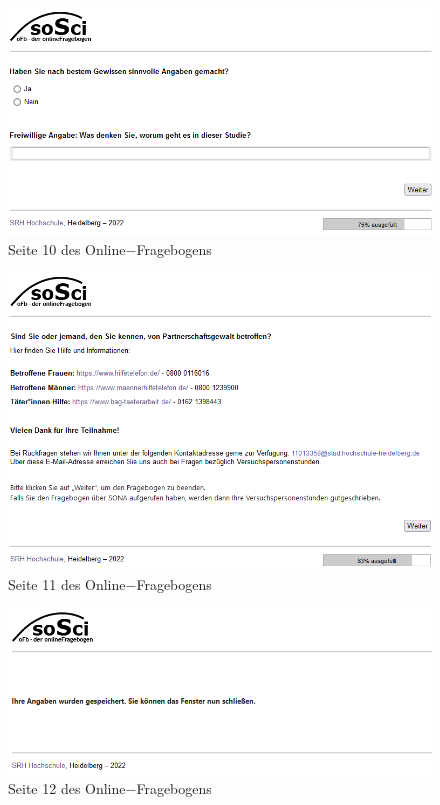 \begin{appendices}
    \begin{figure}[htb!]
        \centering
            \includegraphics[width=\textwidth, frame]{Seite 10.png}
            \caption[]{Seite 10 des Online$-$Fragebogens}
    \end{figure}
    
    \newpage
    \begin{figure}[htb!]
        \centering
            \includegraphics[width=\textwidth,frame]{Seite 11.png}
            \caption[]{Seite 11 des Online$-$Fragebogens}
    \end{figure}
    
    \begin{figure}[htb!]
        \centering
            \includegraphics[width=\textwidth, frame]{Seite 12.png}
            \caption[]{Seite 12 des Online$-$Fragebogens}
    \end{figure}


    
    

\end{appendices}
